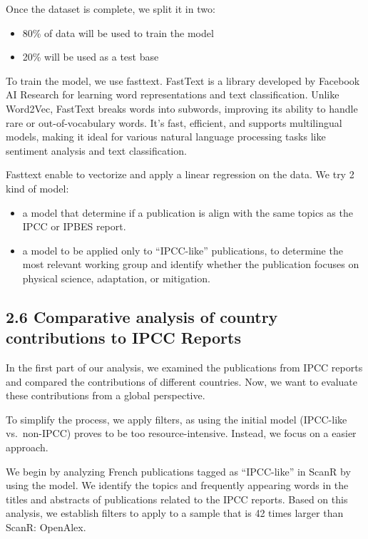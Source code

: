 \documentclass[
]{article}
\providecommand{\tightlist}{%
  \setlength{\itemsep}{0pt}\setlength{\parskip}{0pt}}
\begin{document}
Once the dataset is complete, we split it in two:

\begin{itemize}
\tightlist
\item
  80\% of data will be used to train the model
\item
  20\% will be used as a test base
\end{itemize}

To train the model, we use fasttext. FastText is a library developed by
Facebook AI Research for learning word representations and text
classification. Unlike Word2Vec, FastText breaks words into subwords,
improving its ability to handle rare or out-of-vocabulary words. It's
fast, efficient, and supports multilingual models, making it ideal for
various natural language processing tasks like sentiment analysis and
text classification.

Fasttext enable to vectorize and apply a linear regression on the data.
We try 2 kind of model:

\begin{itemize}
\tightlist
\item
  a model that determine if a publication is align with the same topics
  as the IPCC or IPBES report.
\item
  a model to be applied only to ``IPCC-like'' publications, to determine
  the most relevant working group and identify whether the publication
  focuses on physical science, adaptation, or mitigation.
\end{itemize}

\hypertarget{comparative-analysis-of-country-contributions-to-ipcc-reports}{%
\subsection{2.6 Comparative analysis of country contributions to IPCC
Reports}\label{comparative-analysis-of-country-contributions-to-ipcc-reports}}

In the first part of our analysis, we examined the publications from
IPCC reports and compared the contributions of different countries. Now,
we want to evaluate these contributions from a global perspective.

To simplify the process, we apply filters, as using the initial model
(IPCC-like vs.~non-IPCC) proves to be too resource-intensive. Instead,
we focus on a easier approach.

We begin by analyzing French publications tagged as ``IPCC-like'' in
ScanR by using the model. We identify the topics and frequently
appearing words in the titles and abstracts of publications related to
the IPCC reports. Based on this analysis, we establish filters to apply
to a sample that is 42 times larger than ScanR: OpenAlex.
\end{document}
